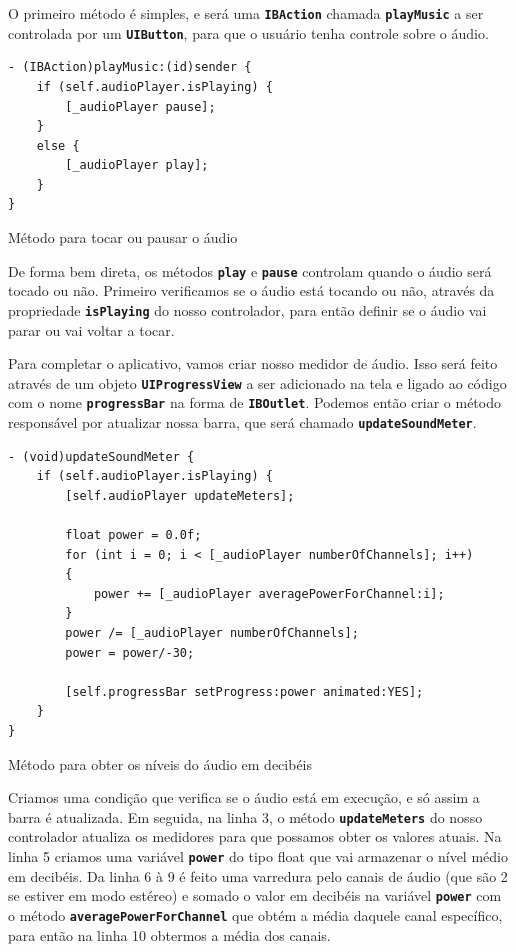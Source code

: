 \documentclass[a4paper,12pt,brazil,doubleside]{book}
\begin{document}
\begin{singlespace}
O primeiro método é simples, e será uma \texttt{\textbf{IBAction}} chamada \texttt{\textbf{playMusic}} a ser controlada por um \texttt{\textbf{UIButton}}, para que o usuário tenha controle sobre o áudio.

\begin{listing}[H]
\begin{verbatim}
- (IBAction)playMusic:(id)sender {
    if (self.audioPlayer.isPlaying) {
        [_audioPlayer pause];
    }
    else {
        [_audioPlayer play];
    }
}
\end{verbatim}
\caption{Método para tocar ou pausar o áudio}
\end{listing}


De forma bem direta, os métodos \texttt{\textbf{play}} e \texttt{\textbf{pause}} controlam quando o áudio será tocado ou não. Primeiro verificamos se o áudio está tocando ou não, através da propriedade \texttt{\textbf{isPlaying}} do nosso controlador, para então definir se o áudio vai parar ou vai voltar a tocar.

Para completar o aplicativo, vamos criar nosso medidor de áudio. Isso será feito através de um objeto \texttt{\textbf{UIProgressView}} a ser adicionado na tela e ligado ao código com o nome \texttt{\textbf{progressBar}} na forma de \texttt{\textbf{IBOutlet}}. Podemos então criar o método responsável por atualizar nossa barra, que será chamado \texttt{\textbf{updateSoundMeter}}.

\begin{listing}[H]
\begin{verbatim}
- (void)updateSoundMeter {
    if (self.audioPlayer.isPlaying) {
        [self.audioPlayer updateMeters];
    
        float power = 0.0f;
        for (int i = 0; i < [_audioPlayer numberOfChannels]; i++)
        {
            power += [_audioPlayer averagePowerForChannel:i];
        }
        power /= [_audioPlayer numberOfChannels];
        power = power/-30;
        
        [self.progressBar setProgress:power animated:YES];
    }
}
\end{verbatim}
\caption{Método para obter os níveis do áudio em decibéis}
\end{listing}


Criamos uma condição que verifica se o áudio está em execução, e só assim a barra é atualizada. Em seguida, na linha 3, o método \texttt{\textbf{updateMeters}} do nosso controlador atualiza os medidores para que possamos obter os valores atuais. Na linha 5 criamos uma variável \texttt{\textbf{power}} do tipo float que vai armazenar o nível médio em decibéis. Da linha 6 à 9 é feito uma varredura pelo canais de áudio (que são 2 se estiver em modo estéreo) e somado o valor em decibéis na variável \texttt{\textbf{power}} com o método \texttt{\textbf{averagePowerForChannel}} que obtém a média daquele canal específico, para então na linha 10 obtermos a média dos canais.


\end{singlespace}
\end{document}
